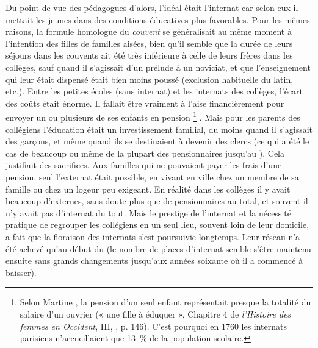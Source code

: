  Du point de vue des pédagogues d'alors, l'idéal était l'internat car selon eux il mettait les jeunes dans des conditions éducatives plus favorables. Pour les mêmes raisons, la formule homologue du \emph{couvent} se généralisait au même moment à l'intention des filles de familles aisées, bien qu'il semble que la durée de leurs séjours dans les couvents ait été très inférieure à celle de leurs frères dans les collèges, sauf quand il s'agissait d'un prélude à un noviciat, et que l'enseignement qui leur était dispensé était bien moins poussé (exclusion habituelle du latin, etc.). Entre les petites écoles (sans internat) et les internats des collèges, l'écart des coûts était énorme. Il fallait être vraiment à l'aise financièrement pour envoyer un ou plusieurs de ses enfants en pension%
\footnote{Selon Martine , la pension d'un seul enfant représentait presque la totalité du salaire d'un ouvrier (« une fille à éduquer », Chapitre 4 de \emph{l'Histoire des femmes en Occident}, III, , p. 146). C'est pourquoi en 1760 les internats parisiens n'accueillaient que 13~\% de la population scolaire.}%
. Mais pour les parents des collégiens l'éducation était un investissement familial, du moins quand il s'agissait des garçons, et même quand ils se destinaient à devenir des clercs (ce qui a été le cas de beaucoup ou même de la plupart des pensionnaires jusqu'au ). Cela justifiait des sacrifices. Aux familles qui ne pouvaient payer les frais d'une pension, seul l'externat était possible, en vivant en ville chez un membre de sa famille ou chez un logeur peu exigeant. En réalité dans les collèges il y avait beaucoup d'externes, sans doute plus que de pensionnaires au total, et souvent il n'y avait pas d'internat du tout. Mais le prestige de l'internat et la nécessité pratique de regrouper les collégiens en un seul lieu, souvent loin de leur domicile, a fait que la floraison des internats s'est poursuivie longtemps. Leur réseau n'a été achevé qu'au début du  (le nombre de places d'internat semble s'être maintenu ensuite sans grands changements jusqu'aux années soixante où il a commencé à baisser). 

